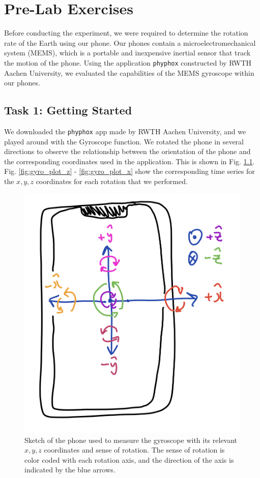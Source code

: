 \documentclass[a4paper]{report}
\numberwithin{equation}{section}
\begin{document}
\chapter{Pre-Lab Exercises}

Before conducting the experiment, we were required to determine the rotation rate of the Earth using our phone. Our phones
contain a microelectromechanical system (MEMS), which is a portable and inexpensive inertial sensor that track the motion of
the phone. Using the application \texttt{phyphox} constructed by RWTH Aachen University, we evaluated the capabilities
of the MEMS gyroscope within our phones. 

\section{Task 1: Getting Started}

We downloaded the \texttt{phyphox} app made by RWTH Aachen University, and we played around with the Gyroscope function. We rotated the phone in several directions 
to observe the relationship between the orientation of the phone and the corresponding coordinates used in the application. This is shown in Fig. \ref{fig:phone_sketch}. 
Fig. \ref{fig:gyro_plot_z} - \ref{fig:gyro_plot_x} show the corresponding time series for the $x, y, z$ coordinates for each rotation that we performed. 

\begin{figure}[hbt!]
	\centering
	\includegraphics[width=0.6\columnwidth]{Phone_sketch.png}

	\caption{Sketch of the phone used to measure the gyroscope with its relevant $x, y, z$ coordinates and sense of rotation. 
            The sense of rotation is color coded with each rotation axis, and the direction of the axis is indicated by the blue arrows.}
	\label{fig:phone_sketch}
\end{figure}
\end{document}
